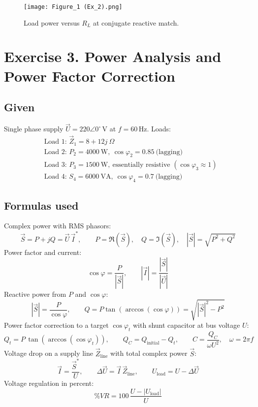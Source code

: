 \documentclass[a4paper,12pt]{article}
\begin{document}
\begin{figure}[H]
\centering
\texttt{[image: Figure\_1 (Ex\_2).png]}
\caption{Load power versus \( R_L \) at conjugate reactive match.}
\label{fig:power_curve}
\end{figure}




\section{Exercise 3. Power Analysis and Power Factor Correction}

\subsection*{Given}
Single phase supply \( \vec U = 220\angle 0^\circ \,\text{V} \) at \( f = 60\,\text{Hz} \).  
Loads:
\[
\begin{aligned}
&\text{Load 1: } \vec Z_1 = 8 + 12j\ \Omega \\
&\text{Load 2: } P_2 = 4000\ \text{W},\ \cos\varphi_2 = 0.85\ \text{(lagging)} \\
&\text{Load 3: } P_3 = 1500\ \text{W},\ \text{essentially resistive }(\cos\varphi_3 \approx 1) \\
&\text{Load 4: } S_4 = 6000\ \text{VA},\ \cos\varphi_4 = 0.7\ \text{(lagging)}
\end{aligned}
\]

\subsection*{Formulas used}
Complex power with RMS phasors:
\[
\vec S = P + jQ = \vec U\,\vec I^{\ast}, \qquad
P = \Re(\vec S),\quad Q = \Im(\vec S),\quad |\vec S| = \sqrt{P^2+Q^2}
\]
Power factor and current:
\[
\cos\varphi = \frac{P}{|\vec S|}, \qquad |\vec I| = \frac{|\vec S|}{|\vec U|}
\]
Reactive power from \(P\) and \(\cos\varphi\):
\[
|\vec S| = \frac{P}{\cos\varphi}, \qquad
Q = P \tan(\arccos(\cos\varphi)) = \sqrt{|\vec S|^2 - P^2}
\]
Power factor correction to a target \(\cos\varphi_t\) with shunt capacitor at bus voltage \(U\):
\[
Q_t = P\,\tan(\arccos(\cos\varphi_t)),\qquad
Q_C = Q_{\text{initial}} - Q_t,\qquad
C = \frac{Q_C}{\omega U^2},\quad \omega = 2\pi f
\]
Voltage drop on a supply line \( \vec Z_{\text{line}} \) with total complex power \(\vec S\):
\[
\vec I = \frac{\vec S^{\ast}}{U}, \qquad
\Delta \vec U = \vec I\,\vec Z_{\text{line}}, \qquad
U_{\text{load}} = U - \Delta \vec U
\]
Voltage regulation in percent:
\[
\%VR = 100\,\frac{U - |U_{\text{load}}|}{U}
\]
\end{document}
